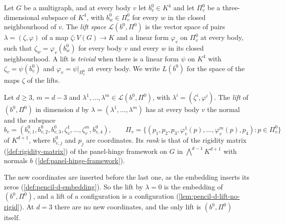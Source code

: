 \begin{definition}
  \label{def:pencil-d-lift}
  \leanok
  Let $G$ be a multigraph, and at every body $v$ let $b^0_v \in K^4$ and
  let $\Pi^0_v$ be a three-dimensional subspace of $K^4$, with
  $b^0_w \in \Pi^0_v$ for every $w$ in the closed neighbourhood of $v$.
  The \emph{lift space} $\mathcal{L}(b^0, \Pi^0)$ is the vector space of
  pairs $\lambda = (\zeta, \varphi)$ of a map $\zeta \colon V(G) \to K$
  and a linear form $\varphi_v$ on $\Pi^0_v$ at every body, such that
  $\zeta_w = \varphi_v(b^0_w)$ for every body $v$ and every $w$ in its
  closed neighbourhood. A lift is \emph{trivial} when there is a linear
  form $\psi$ on $K^4$ with $\zeta_v = \psi(b^0_v)$ and
  $\varphi_v = \psi|_{\Pi^0_v}$ at every body. We write $L(b^0)$ for the
  space of the maps $\zeta$ of the lifts.

  Let $d \ge 3$, $m = d - 3$ and $\lambda^1, \dots, \lambda^m \in
  \mathcal{L}(b^0, \Pi^0)$, with $\lambda^i = (\zeta^i, \varphi^i)$. The
  \emph{lift} of $(b^0, \Pi^0)$ in dimension $d$ by
  $\lambda = (\lambda^1, \dots, \lambda^m)$ has at every body $v$ the
  normal and the subspace
  \[
    b_v = (b^0_{v,1}, b^0_{v,2}, b^0_{v,3}, \zeta^1_v, \dots, \zeta^m_v,
    b^0_{v,4}), \qquad
    \Pi_v = \{(p_1, p_2, p_3, \varphi^1_v(p), \dots, \varphi^m_v(p), p_4)
    : p \in \Pi^0_v\}
  \]
  of $K^{d+1}$, where $b^0_{v,j}$ and $p_j$ are coordinates. Its
  \emph{rank} is that of the rigidity matrix
  (\cref{def:rigidity-matrix}) of the panel-hinge framework on $G$ in
  $\bigwedge^{d-1} K^{d+1}$ with normals $b$
  (\cref{def:panel-hinge-framework}).
\end{definition}

The new coordinates are inserted before the last one, as the embedding
inserts its zeros (\cref{def:pencil-d-embedding}). So the lift by
$\lambda = 0$ is the embedding of $(b^0, \Pi^0)$, and a lift of a
configuration is a configuration (\cref{lem:pencil-d-lift-no-rigid}). At
$d = 3$ there are no new coordinates, and the only lift is
$(b^0, \Pi^0)$ itself.


